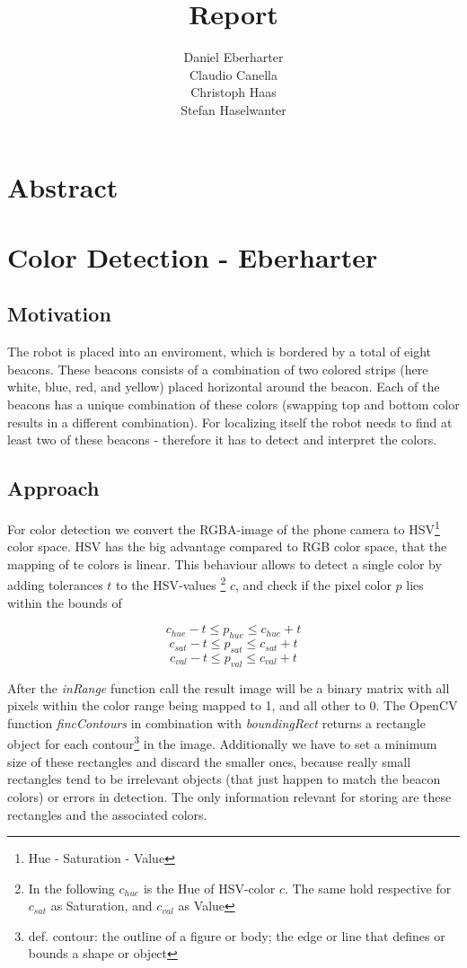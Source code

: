 \documentclass[703031]{iisreport}
\title{Report}
\author{Daniel Eberharter\\ Claudio Canella\\ Christoph Haas\\ Stefan Haselwanter}
\begin{document}
\maketitle

\section{Abstract}


\section{Color Detection - Eberharter}
\subsection{Motivation}
The robot is placed into an enviroment, which is bordered by a total of eight beacons. These beacons consists of a combination of two colored strips (here white, blue, red, and yellow) placed horizontal around the beacon. Each of the beacons has a unique combination of these colors (swapping top and bottom color results in a different combination).
For localizing itself the robot needs to find at least two of these beacons - therefore it has to detect and interpret the colors.
\subsection{Approach}
For color detection we convert the RGBA-image of the phone camera to HSV\footnote{Hue - Saturation - Value} color space. HSV has the big advantage compared to RGB color space, that the mapping of te colors is linear. This behaviour allows to detect a single color by adding tolerances $t$ to the HSV-values \footnote{In the following $c_{hue}$ is the Hue of HSV-color $c$. The same hold respective for $c_{sat}$ as Saturation, and $c_{val}$ as Value} $c$, and check if the pixel color $p$ lies within the bounds of 

\[c_{hue} - t \le p_{hue} \le c_{hue} + t\]
\[c_{sat} - t \le p_{sat} \le c_{sat} + t\]
\[c_{val} - t \le p_{val} \le c_{val} + t\]

After the \emph{inRange} function call\cite{opencv_man_arrays} the result image will be a binary matrix with all pixels within the color range being mapped to 1, and all other to 0. The OpenCV function \emph{fincContours}\cite{opencv_man_struct_analysis} in combination with \emph{boundingRect}\cite{opencv_man_struct_analysis} returns a rectangle object for each contour\footnote{def. contour: the outline of a figure or body; the edge or line that defines or bounds a shape or object\cite{dict_contour}} in the image. Additionally we have to set a minimum size of these rectangles and discard the smaller ones, because really small rectangles tend to be irrelevant objects (that just happen to match the beacon colors) or errors in detection.
The only information relevant for storing are these rectangles and the associated colors. 
\end{document}
